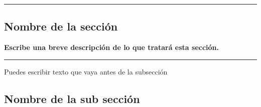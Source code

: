 {\color{gray}\hrule}
\begin{center}
\section{Nombre de la sección}
\textbf{Escribe una breve descripción de lo que tratará esta sección.}
\end{center}
{\color{gray}\hrule}

\begin{multicols}{2}

Puedes escribir texto que vaya antes de la subsección

\subsection{Nombre de la sub sección}

\lipsum[4-5]

\end{multicols}
